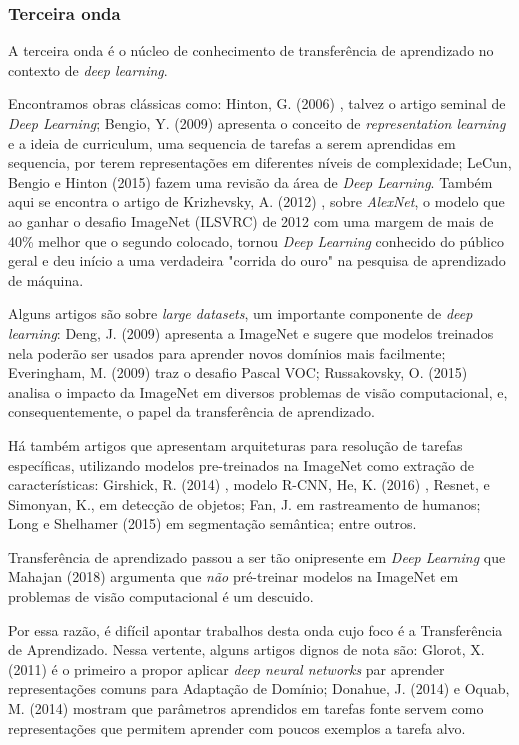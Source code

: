 \documentclass[sigconf]{acmart}
\begin{document}
\subsubsection{Terceira onda}\label{terceira_onda}
A terceira onda é o núcleo de conhecimento de transferência de aprendizado no contexto de \emph{deep learning}. 

Encontramos obras clássicas como: Hinton, G. (2006) \cite{Hinton2006}, talvez o artigo seminal de \emph{Deep Learning}; Bengio, Y. (2009) \cite{Bengio2009} apresenta o conceito de \emph{representation learning} e a ideia de curriculum, uma sequencia de tarefas a serem aprendidas em sequencia, por terem representações em diferentes níveis de complexidade; LeCun, Bengio e Hinton (2015)\cite{LeCun2015} fazem uma revisão da área de \emph{Deep Learning}. Também aqui se encontra o artigo de Krizhevsky, A. (2012) \cite{alexnet}, sobre \emph{AlexNet}, o modelo que ao ganhar o desafio ImageNet (ILSVRC) de 2012 com uma margem de mais de 40\% melhor que o segundo colocado, tornou \emph{Deep Learning} conhecido do público geral e deu início a uma verdadeira "corrida do ouro" na pesquisa de aprendizado de máquina. 

Alguns artigos são sobre \emph{large datasets}, um importante componente de \emph{deep learning}:  Deng, J. (2009) \cite{Deng2009} apresenta a ImageNet e sugere que modelos treinados nela poderão ser usados para aprender novos domínios mais facilmente; Everingham, M. (2009) \cite{Everingham2009} traz o desafio Pascal VOC; Russakovsky, O. (2015) \cite{Russakovsky2015} analisa o impacto da ImageNet em diversos problemas de visão computacional, e, consequentemente, o papel da transferência de aprendizado. 

Há também artigos que apresentam arquiteturas para resolução de tarefas específicas, utilizando modelos pre-treinados na ImageNet como extração de características: Girshick, R. (2014) \cite{Girshick2014}, modelo R-CNN, He, K. (2016) \cite{He2016}, Resnet, e Simonyan, K.\cite{simonyan2014very}, em detecção de objetos;  Fan, J. \cite{JialueFan2010} em rastreamento de humanos; Long e Shelhamer (2015) \cite{Long2015} em segmentação semântica; entre outros.

Transferência de aprendizado passou a ser tão onipresente em \emph{Deep Learning} que Mahajan (2018) \cite{mahajan2018exploring} argumenta que \emph{não} pré-treinar modelos na ImageNet em problemas de visão computacional é um descuido.  

Por essa razão, é difícil apontar trabalhos desta onda cujo foco é a Transferência de Aprendizado. Nessa vertente, alguns artigos dignos de nota são: Glorot, X. (2011) \cite{glorot2011domain} é o primeiro a propor aplicar \emph{deep neural networks} par aprender representações comuns para Adaptação de Domínio; Donahue, J. (2014)\cite{donahue2014decaf} e Oquab, M. (2014)\cite{Oquab:2014:LTM:2679600.2680210} mostram que parâmetros aprendidos em tarefas fonte servem como representações que permitem aprender com poucos exemplos a tarefa alvo.
\end{document}
